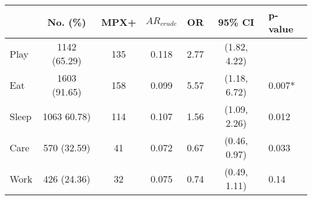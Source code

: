 \begin{tabular}{lccccc}
\centering
\toprule
 \textbf{& No. (\%)} & \textbf{MPX+} & \textbf{$AR_{crude}$} & \textbf{OR} & \textbf{95\% CI} & \textbf{p-value} \\
\midrule
Play & 1142 (65.29) & 135 & 0.118 & 2.77 & (1.82, 4.22) &  \\
Eat & 1603 (91.65) & 158 & 0.099 & 5.57 & (1.18, 6.72) & 0.007* \\
Sleep & 1063 60.78) & 114 & 0.107 & 1.56 & (1.09, 2.26) & 0.012 \\
Care & 570 (32.59) & 41 & 0.072 & 0.67 & (0.46, 0.97) & 0.033 \\
Work & 426 (24.36) & 32 & 0.075 & 0.74 & (0.49, 1.11) & 0.14 \\

\bottomrule
\end{tabular}